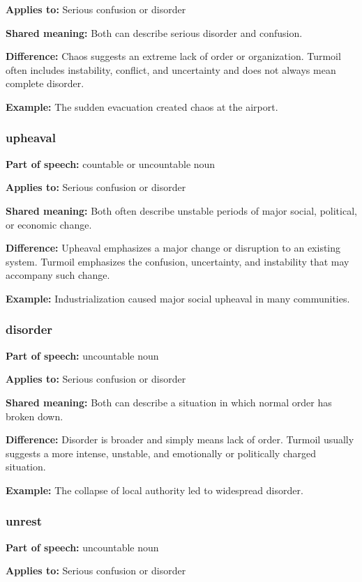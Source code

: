 \documentclass[11pt]{article}
\begin{document}
\textbf{Applies to:} Serious confusion or disorder

\textbf{Shared meaning:} Both can describe serious disorder and confusion.

\textbf{Difference:} Chaos suggests an extreme lack of order or organization. Turmoil often includes instability, conflict, and uncertainty and does not always mean complete disorder.

\textbf{Example:} The sudden evacuation created chaos at the airport.

\subsubsection{upheaval}
\textbf{Part of speech:} countable or uncountable noun

\textbf{Applies to:} Serious confusion or disorder

\textbf{Shared meaning:} Both often describe unstable periods of major social, political, or economic change.

\textbf{Difference:} Upheaval emphasizes a major change or disruption to an existing system. Turmoil emphasizes the confusion, uncertainty, and instability that may accompany such change.

\textbf{Example:} Industrialization caused major social upheaval in many communities.

\subsubsection{disorder}
\textbf{Part of speech:} uncountable noun

\textbf{Applies to:} Serious confusion or disorder

\textbf{Shared meaning:} Both can describe a situation in which normal order has broken down.

\textbf{Difference:} Disorder is broader and simply means lack of order. Turmoil usually suggests a more intense, unstable, and emotionally or politically charged situation.

\textbf{Example:} The collapse of local authority led to widespread disorder.

\subsubsection{unrest}
\textbf{Part of speech:} uncountable noun

\textbf{Applies to:} Serious confusion or disorder
\end{document}
